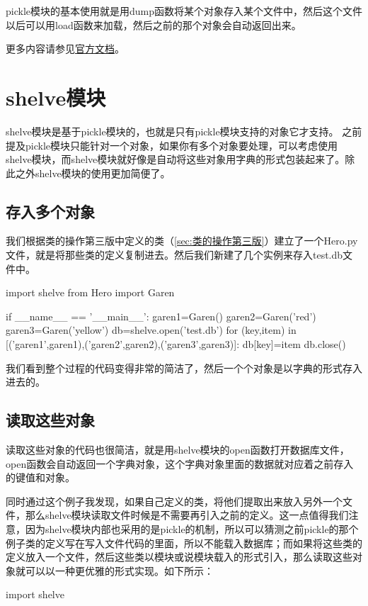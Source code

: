 \documentclass[12pt,oneside]{book}
\begin{document}
\begin{common-format}
pickle模块的基本使用就是用dump函数将某个对象存入某个文件中，然后这个文件以后可以用load函数来加载，然后之前的那个对象会自动返回出来。

\begin{Large}
更多内容请参见\href{https://docs.python.org/3/library/pickle.html}{官方文档}。
\end{Large}

\chapter{shelve模块}
shelve模块是基于pickle模块的，也就是只有pickle模块支持的对象它才支持。 之前提及pickle模块只能针对一个对象，如果你有多个对象要处理，可以考虑使用shelve模块，而shelve模块就好像是自动将这些对象用字典的形式包装起来了。除此之外shelve模块的使用更加简便了。

\section{存入多个对象}
我们根据类的操作第三版中定义的类（\ref{sec:类的操作第三版}）建立了一个Hero.py文件，就是将那些类的定义复制进去。然后我们新建了几个实例来存入test.db文件中。

\begin{tcbpython}
import shelve
from Hero import Garen

if __name__ == '__main__':
    garen1=Garen()
    garen2=Garen('red')
    garen3=Garen('yellow')
    db=shelve.open('test.db')
    for (key,item) in [('garen1',garen1),('garen2',garen2),('garen3',garen3)]:
        db[key]=item
    db.close()
\end{tcbpython}

我们看到整个过程的代码变得非常的简洁了，然后一个个对象是以字典的形式存入进去的。

\section{读取这些对象}
读取这些对象的代码也很简洁，就是用shelve模块的open函数打开数据库文件，open函数会自动返回一个字典对象，这个字典对象里面的数据就对应着之前存入的键值和对象。

同时通过这个例子我发现，如果自己定义的类，将他们提取出来放入另外一个文件，那么shelve模块读取文件时候是不需要再引入之前的定义。这一点值得我们注意，因为shelve模块内部也采用的是pickle的机制，所以可以猜测之前pickle的那个例子类的定义写在写入文件代码的里面，所以不能载入数据库；而如果将这些类的定义放入一个文件，然后这些类以模块或说模块载入的形式引入，那么读取这些对象就可以以一种更优雅的形式实现。如下所示：
\begin{tcbpython}
import shelve


\end{tcbpython}
\end{common-format}
\end{document}
